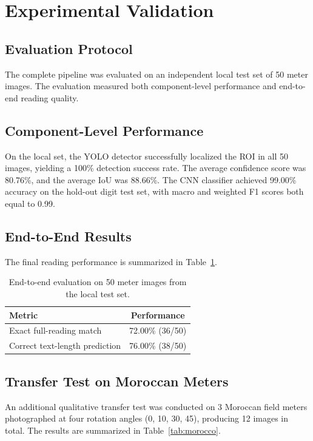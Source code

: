 \documentclass[11pt,a4paper]{article}
\begin{document}
\section{Experimental Validation}

\subsection{Evaluation Protocol}
The complete pipeline was evaluated on an independent local test set of 50 meter images. The evaluation measured both component-level performance and end-to-end reading quality.

\subsection{Component-Level Performance}
On the local set, the YOLO detector successfully localized the ROI in all 50 images, yielding a 100\% detection success rate. The average confidence score was 80.76\%, and the average IoU was 88.66\%. The CNN classifier achieved 99.00\% accuracy on the hold-out digit test set, with macro and weighted F1 scores both equal to 0.99.

\subsection{End-to-End Results}
The final reading performance is summarized in Table~\ref{tab:endtoend}.

\begin{table}[H]
\centering
\begin{tabular}{lc}
\toprule
\textbf{Metric} & \textbf{Performance} \\
\midrule
Exact full-reading match & 72.00\% (36/50) \\
Correct text-length prediction & 76.00\% (38/50) \\
\bottomrule
\end{tabular}
\caption{End-to-end evaluation on 50 meter images from the local test set.}
\label{tab:endtoend}
\end{table}

\subsection{Transfer Test on Moroccan Meters}
An additional qualitative transfer test was conducted on 3 Moroccan field meters photographed at four rotation angles (0\textdegree, 10\textdegree, 30\textdegree, 45\textdegree), producing 12 images in total. The results are summarized in Table~\ref{tab:morocco}.
\end{document}
